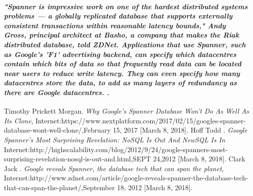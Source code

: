 \documentclass[a4paper,12pt]{article}
\begin{document}
\paragraph{\sl "Spanner is impressive work on one of the hardest distributed systems problems — a globally replicated database that supports externally consistent transactions within reasonable latency bounds," Andy Gross, principal architect at Basho, a company that makes the Riak distributed database, told ZDNet.
Applications that use Spanner, such as Google's 'F1' advertising backend, can specify which datacentres contain which bits of data so that frequently read data can be located near users to reduce write latency. They can even specify how many datacentres store the data, to add as many layers of redundancy as there are Google datacentres.
 .}\cite{Clark}
\begin{thebibliography}{9}
 Timothy Prickett Morgan. \textit{Why Google’s Spanner Database Won’t Do As Well As Its Clone}, 
Internet:https://www.nextplatform.com/2017/02/15/googles-spanner-database-wont-well-clone/,February 15, 2017 [March 8, 2018].
Hoff Todd  . \textit{Google Spanner's Most Surprising Revelation: NoSQL Is Out And NewSQL Is In} 
Internet:http://highscalability.com/blog/2012/9/24/google-spanners-most-surprising-revelation-nosql-is-out-and.html,SEPT 24,2012 [March 8, 2018].
 Clark Jack . \textit{Google reveals Spanner, the database tech that can span the planet},
 Internet:http://www.zdnet.com/article/google-reveals-spanner-the-database-tech-that-can-span-the-planet/,September 18, 2012 [March 8, 2018].
\end{thebibliography}
\end{document}
